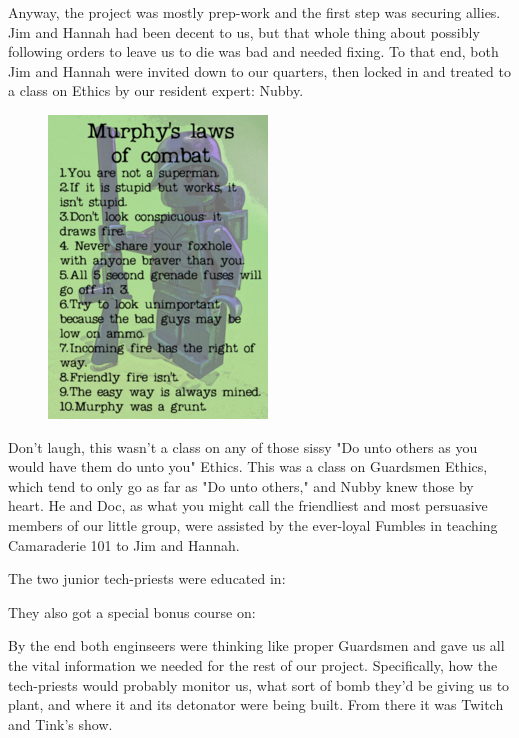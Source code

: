 Anyway, the project was mostly prep-work and the first step was securing allies. 
Jim and Hannah had been decent to us, but that whole thing about possibly following orders to leave us to die was bad and needed fixing. 
To that end, both Jim and Hannah were invited down to our quarters, then locked in and treated to a class on Ethics by our resident expert: 
Nubby.

\begin{figure}
	\begin{center}
		\includegraphics[width=\figwidth]{pics/11/69.png}
	\end{center}
\end{figure}
Don't laugh, this wasn't a class on any of those sissy "Do unto others as you would have them do unto you" Ethics. 
This was a class on Guardsmen Ethics, which tend to only go as far as "Do unto others," and Nubby knew those by heart. 
He and Doc, as what you might call the friendliest and most persuasive members of our little group, were assisted by the ever-loyal Fumbles in teaching Camaraderie 101 to Jim and Hannah.

The two junior tech-priests were educated in: 




They also got a special bonus course on:


By the end both enginseers were thinking like proper Guardsmen and gave us all the vital information we needed for the rest of our project. 
Specifically, how the tech-priests would probably monitor us, what sort of bomb they'd be giving us to plant, and where it and its detonator were being built. 
From there it was Twitch and Tink's show.

